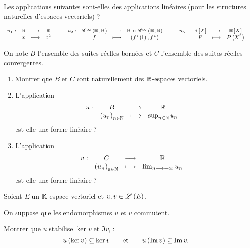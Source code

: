 \begin{exo}[Exercice 3]
Les applications suivantes sont-elles des applications linéaires (pour les structures naturelles d'espaces vectoriels) ?

\[\fonction{u_1}{\R}{\R}{x}{x^2}\qquad\fonction{u_2}{\ensclasse{\infty}{\R}{\R}}{\R\times\ensclasse{\infty}{\R}{\R}}{f}{\paren{f\prim\paren{1},f\seconde}}\qquad\fonction{u_3}{\poly[\R]}{\poly[\R]}{P}{P\paren{X^2}}\]
\end{exo}

\begin{corr}
\end{corr}

\begin{exo}[Exercice 4]
On note \(B\) l'ensemble des suites réelles bornées et \(C\) l'ensemble des suites réelles convergentes.

\begin{enumerate}
\item Montrer que \(B\) et \(C\) sont naturellement des \(\mathbb{R}\)-espaces vectoriels. \\

\item L'application \[\begin{array}[t]{cccc}u : & B & \longrightarrow & \mathbb{R} \\ & \left(u_n\right)_{n\in\mathbb{N}} & \longmapsto & \sup_{n\in\mathbb{N}}u_n\end{array}\] est-elle une forme linéaire ? \\

\item L'application \[\begin{array}[t]{cccc}v : & C & \longrightarrow & \mathbb{R} \\ & \left(u_n\right)_{n\in\mathbb{N}} & \longmapsto & \lim_{n\longrightarrow+\infty}u_n\end{array}\] est-elle une forme linéaire ?
\end{enumerate}
\end{exo}

\begin{corr}
\end{corr}

\begin{exo}[Exercice 5]
Soient \(E\) un \(\mathbb{K}\)-espace vectoriel et \(u,v\in\mathscr{L}\left(E\right)\).

On suppose que les endomorphismes \(u\) et \(v\) commutent.

Montrer que \(u\) stabilise \(\ker v\) et \(\Im v\), \cad : \[u\left(\ker v\right)\subseteq\ker v\qquad\text{et}\qquad u\left(\operatorname{Im} v\right)\subseteq\operatorname{Im} v.\]
\end{exo}

\begin{corr}
\end{corr}


